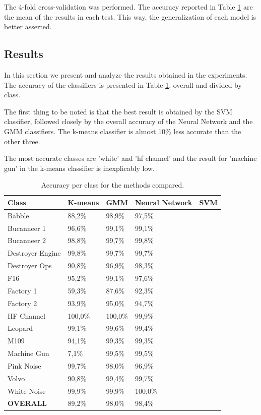 \documentclass[12pt]{article}
\begin{document}
The 4-fold cross-validation was performed. The accuracy reported in Table \ref{tab:acc} are the mean of the results in each test. This way, the generalization of each model is better asserted.

\subsection{Results} \label{exp:res}


In this section we present and analyze the results obtained in the experiments. The accuracy of the classifiers is presented in Table \ref{tab:acc}, overall and divided by class.

The first thing to be noted is that the best result is obtained by the SVM classifier, followed closely by the overall accuracy of the Neural Network and the GMM classifiers. The k-means classifier is almost 10\% less accurate than the other three.

The most accurate classes are 'white' and 'hf channel' and the result for 'machine gun' in the k-means classifier is inexplicably low.

\begin{table}[ht]
\centering
\caption{Accuracy per class for the methods compared.}
\label{tab:acc}
\begin{tabular}{l|llll}
\hline
Class & K-means & GMM & Neural Network & SVM \\
\hline
Babble & 88,2\% & 98,9\% & 97,5\% &  \\
Bucanneer 1 & 96,6\% & 99,1\% & 99,1\% & \\
Bucanneer 2 & 98,8\% & 99,7\% & 99,8\% & \\
Destroyer Engine & 99,8\% & 99,7\% & 99,7\% & \\
Destroyer Ops & 90,8\% & 96,9\% & 98,3\% & \\
F16 & 95,2\% & 99,1\% & 97,6\% & \\
Factory 1 & 59,3\% & 87,6\% & 92,3\% & \\
Factory 2 & 93,9\% & 95,0\% & 94,7\% & \\
HF Channel & 100,0\% & 100,0\% & 99,9\% & \\
Leopard & 99,1\% & 99,6\% & 99,4\% & \\
M109 & 94,1\% & 99,3\% & 99,3\% & \\
Machine Gun & 7,1\% & 99,5\% & 99,5\% & \\
Pink Noise & 99,7\% & 98,0\% & 96,9\% & \\
Volvo & 90,8\% & 99,4\% & 99,7\% & \\
White Noise & 99,9\% & 99,9\% & 100,0\% & \\
\hline
\textbf{OVERALL} & 89,2\% & 98,0\% & 98,4\% & \\
\hline
\end{tabular}
\end{table}
\end{document}
